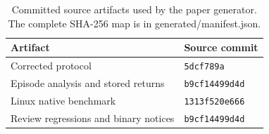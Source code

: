 \begin{table}[tbp]
\centering\small
\setlength{\tabcolsep}{4pt}
\caption{Committed source artifacts used by the paper generator. The complete SHA-256 map is in generated/manifest.json.}\label{tab:provenance}
\begin{tabular}{ll}
\toprule
Artifact & Source commit \\
\midrule
Corrected protocol & \texttt{5dcf789a} \\
Episode analysis and stored returns & \texttt{b9cf14499d4d} \\
Linux native benchmark & \texttt{1313f520e666} \\
Review regressions and binary notices & \texttt{b9cf14499d4d} \\
\bottomrule
\end{tabular}
\end{table}
